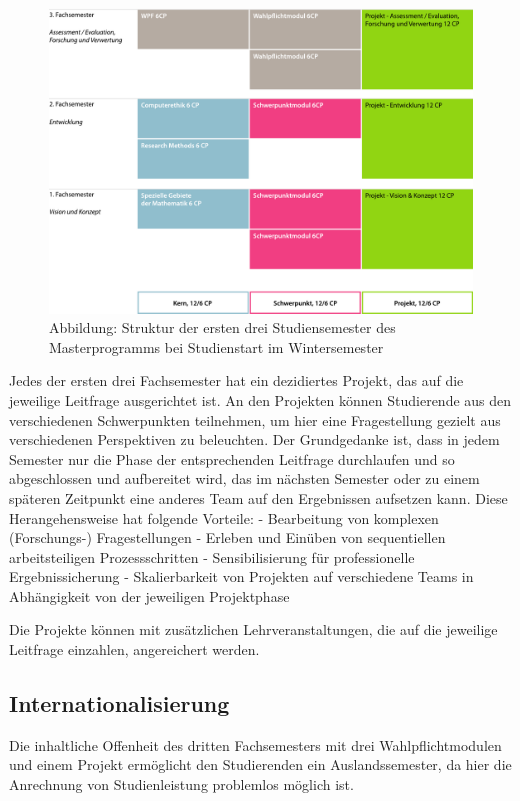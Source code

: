 \begin{figure}[htbp][htbp]
\centering
\includegraphics[width=\columnwidth]{../anhaenge/bilder/ma-struktur.pdf}
\caption{Abbildung: Struktur der ersten drei Studiensemester des
Masterprogramms bei Studienstart im Wintersemester}
\end{figure}

Jedes der ersten drei Fachsemester hat ein dezidiertes Projekt, das auf
die jeweilige Leitfrage ausgerichtet ist. An den Projekten können
Studierende aus den verschiedenen Schwerpunkten teilnehmen, um hier eine
Fragestellung gezielt aus verschiedenen Perspektiven zu beleuchten. Der
Grundgedanke ist, dass in jedem Semester nur die Phase der
entsprechenden Leitfrage durchlaufen und so abgeschlossen und
aufbereitet wird, das im nächsten Semester oder zu einem späteren
Zeitpunkt eine anderes Team auf den Ergebnissen aufsetzen kann. Diese
Herangehensweise hat folgende Vorteile: - Bearbeitung von komplexen
(Forschungs-) Fragestellungen - Erleben und Einüben von sequentiellen
arbeitsteiligen Prozessschritten - Sensibilisierung für professionelle
Ergebnissicherung - Skalierbarkeit von Projekten auf verschiedene Teams
in Abhängigkeit von der jeweiligen Projektphase

Die Projekte können mit zusätzlichen Lehrveranstaltungen, die auf die
jeweilige Leitfrage einzahlen, angereichert werden.

\subsection{Internationalisierung}\label{internationalisierung}

Die inhaltliche Offenheit des dritten Fachsemesters mit drei
Wahlpflichtmodulen und einem Projekt ermöglicht den Studierenden ein
Auslandssemester, da hier die Anrechnung von Studienleistung problemlos
möglich ist.

